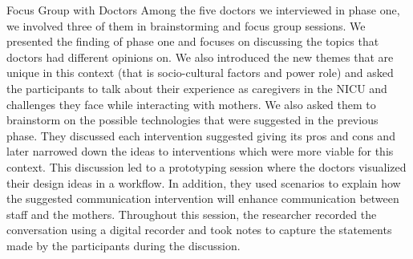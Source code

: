 Focus Group with Doctors
Among the five doctors we interviewed in phase one, we involved three of them in brainstorming and focus group sessions. We presented the finding of phase one and focuses on discussing the topics that doctors had different opinions on. We also introduced the new themes that are unique in this context (that is socio-cultural factors and power role) and asked the participants to talk about their experience as caregivers in the NICU and challenges they face while interacting with mothers. We also asked them to brainstorm on the possible technologies that were suggested in the previous phase. They discussed each intervention suggested giving its pros and cons and later narrowed down the ideas to interventions which were more viable for this context. This discussion led to a prototyping session where the doctors visualized their design ideas in a workflow. In addition, they used scenarios to explain how the suggested communication intervention will enhance communication between staff and the mothers. Throughout this session, the researcher recorded the conversation using a digital recorder and took notes to capture the statements made by the participants during the discussion. 

